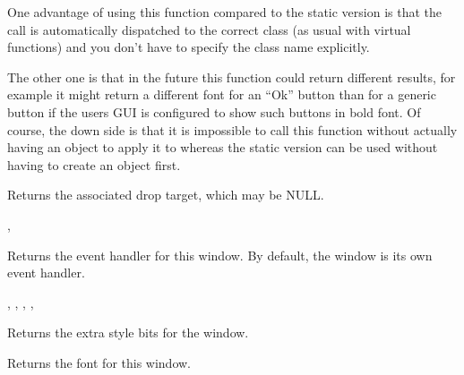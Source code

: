 One advantage of using this function compared to the static version is that
the call is automatically dispatched to the correct class (as usual with
virtual functions) and you don't have to specify the class name explicitly.

The other one is that in the future this function could return different
results, for example it might return a different font for an ``Ok'' button
than for a generic button if the users GUI is configured to show such buttons
in bold font. Of course, the down side is that it is impossible to call this
function without actually having an object to apply it to whereas the static
version can be used without having to create an object first.


\label{wxwindowgetdroptarget}


Returns the associated drop target, which may be NULL.


,


\label{wxwindowgeteventhandler}


Returns the event handler for this window. By default, the window is its
own event handler.


,\rtfsp
{},\rtfsp
{},\rtfsp
{},\rtfsp
{}\rtfsp


\label{wxwindowgetextrastyle}


Returns the extra style bits for the window.


\label{wxwindowgetfont}


Returns the font for this window.


